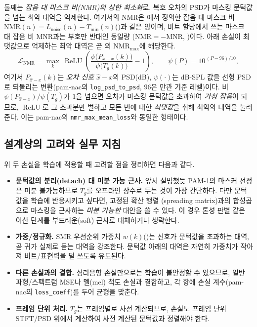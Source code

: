\documentclass[11pt,a4paper]{article}
\newcommand{\MNR}{\mathrm{MNR}}                        %
\newcommand{\NMR}{\mathrm{NMR}}                        %
\begin{document}
둘째는 \emph{잡음 대 마스크 비(NMR)의 상한 최소화}로, 복호 오차의 PSD가 마스킹
문턱값을 넘는 최악 대역을 억제한다. 여기서의 NMR은 에서 정의한
잡음 대 마스크 비 $\NMR(n)=L_{\mathrm{noise}}(n)-T_{\min}(n)$()과 같은
양이며, 비트 할당에서 쓰는 마스크 대 잡음 비 $\MNR$과는 부호만 반대인 동일량
($\NMR=-\MNR$, )이다. 아래 손실이 최댓값으로 억제하는 최악 대역은
곧 의 $\NMR_{\max}$에 해당한다.
\begin{equation}\label{eq:nmrloss}
  \mathcal{L}_{\mathrm{NMR}}
   = \max_{k}\ \operatorname{ReLU}\!\left(
     \frac{\psi\bigl(P_{\hat{x}-x}(k)\bigr)}{\psi\bigl(T_g(k)\bigr)} - 1
   \right),
  \qquad
  \psi(P) = 10^{\,(P - 96)/10},
\end{equation}
여기서 $P_{\hat{x}-x}(k)$는 \emph{오차 신호} $\hat{x}-x$의 PSD(dB), $\psi(\cdot)$는
dB-SPL 값을 선형 PSD로 되돌리는 변환(pam-nac의 \texttt{log\_psd\_to\_psd},
$96$은 만관 기준 레벨)이다. 비 $\psi(P_{\hat{x}-x})/\psi(T_g)$가 $1$을 넘으면
오차가 마스킹 문턱값을 초과하여 \emph{가청 잡음}이 되므로, $\operatorname{ReLU}$로
그 초과분만 벌하고 모든 빈에 대한 \emph{최댓값}을 취해 최악의 대역을 눌러 준다.
이는 pam-nac의 \texttt{nmr\_max\_mean\_loss}와 동일한 형태이다.

\subsection{설계상의 고려와 실무 지침}
위 두 손실을 학습에 적용할 때 고려할 점을 정리하면 다음과 같다.

\begin{itemize}
  \item \textbf{문턱값의 분리(detach) 대 미분 가능 근사.} 앞서 설명했듯 PAM-1의
        마스커 선정은 미분 불가능하므로 $T_g$를 오프라인 상수로 두는 것이 가장
        간단하다. 다만 문턱값을 학습에 반응시키고 싶다면, 고정된 확산 행렬
        (spreading matrix)과의 합성곱으로 마스킹을 근사하는 \emph{미분 가능한}
        대안을 쓸 수 있다. 이 경우 톤성 판별 같은 이산 단계를 부드러운(soft)
        근사로 대체하거나 생략한다.
  \item \textbf{가중/정규화.} SMR 우선순위 가중치 $w(k)$()는
        신호가 문턱값을 초과하는 대역, 곧 귀가 실제로 듣는 대역을 강조한다.
        문턱값 아래의 대역은 자연히 가중치가 작아져 비트/표현력을 덜 쓰도록
        유도된다.
  \item \textbf{다른 손실과의 결합.} 심리음향 손실만으로는 학습이 불안정할 수
        있으므로, 일반 파형/스펙트럼 MSE나 멜(mel) 척도 손실과 결합하고, 각 항에
        손실 계수(pam-nac의 \texttt{loss\_coeff})를 두어 균형을 맞춘다.
  \item \textbf{프레임 단위 처리.} $T_g$는 프레임별로 사전 계산되므로, 손실도
        프레임 단위 STFT/PSD 위에서 계산하여 사전 계산된 문턱값과 정렬해야 한다.
\end{itemize}
\end{document}
